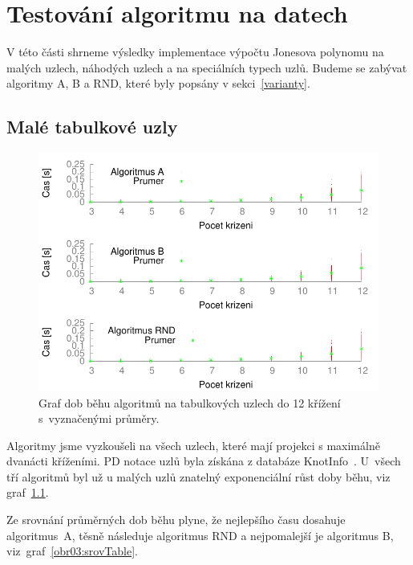 
\chapter{Testování algoritmu na datech}

V této části shrneme výsledky implementace výpočtu Jonesova polynomu na malých uzlech, náhodých uzlech a na speciálních typech uzlů.
Budeme se zabývat algoritmy A, B a RND, které byly popsány v sekci~\ref{varianty}.

\section{Malé tabulkové uzly}

\begin{figure}[p]\centering
\includegraphics{../img/multiTable}
\caption{Graf dob běhu algoritmů na tabulkových uzlech do 12 křížení s~vyznačenými průměry.}
\label{obr03:multiTable}
\end{figure}

Algoritmy jsme vyzkoušeli na všech uzlech, které mají projekci s maximálně dvanácti kříženími. PD notace uzlů byla získána z databáze KnotInfo~\cite{knotinfo}.
U~všech tří algoritmů byl už u malých uzlů znatelný exponenciální růst doby běhu, viz graf~\ref{obr03:multiTable}. 

Ze srovnání průměrných dob běhu plyne, že nejlepšího času dosahuje algoritmus~A, těsně následuje algoritmus RND a nejpomalejší je algoritmus B, viz~graf~\ref{obr03:srovTable}. 
	
